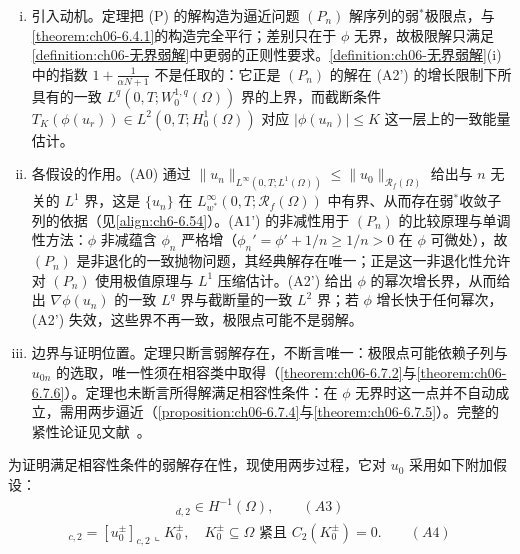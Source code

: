 \documentclass[../../main.tex]{subfiles}%
\begin{document}
\begin{remark}\label{remark:ch06-无界存在动机}
\begin{enumerate}[(i)]
\item 引入动机。定理把 (P) 的解构造为逼近问题 $(P_n)$ 解序列的弱$^*$极限点，与\cref{theorem:ch06-6.4.1}的构造完全平行；差别只在于 $\phi$ 无界，故极限解只满足\cref{definition:ch06-无界弱解}中更弱的正则性要求。\cref{definition:ch06-无界弱解}(i) 中的指数 $1+\frac{1}{\alpha N+1}$ 不是任取的：它正是 $(P_n)$ 的解在 (A2') 的增长限制下所具有的一致 $L^q(0,T;W^{1,q}_0(\Omega))$ 界的上界，而截断条件 $T_K(\phi(u_r))\in L^2(0,T;H^1_0(\Omega))$ 对应 $|\phi(u_n)|\leqslant K$ 这一层上的一致能量估计。

\item 各假设的作用。(A0) 通过 $\|u_n\|_{L^\infty(0,T;L^1(\Omega))}\leqslant\|u_0\|_{\mathscr{R}_f(\Omega)}$ 给出与 $n$ 无关的 $L^1$ 界，这是 $\{u_n\}$ 在 $L^\infty_{w^*}(0,T;\mathscr{R}_f(\Omega))$ 中有界、从而存在弱$^*$收敛子列的依据（见\eqref{align:ch6-6.54}）。(A1') 的非减性用于 $(P_n)$ 的比较原理与单调性方法：$\phi$ 非减蕴含 $\phi_n$ 严格增（$\phi_n'=\phi'+1/n\geqslant1/n>0$ 在 $\phi$ 可微处），故 $(P_n)$ 是非退化的一致抛物问题，其经典解存在唯一；正是这一非退化性允许对 $(P_n)$ 使用极值原理与 $L^1$ 压缩估计。(A2') 给出 $\phi$ 的幂次增长界，从而给出 $\nabla\phi(u_n)$ 的一致 $L^q$ 界与截断量的一致 $L^2$ 界；若 $\phi$ 增长快于任何幂次，(A2') 失效，这些界不再一致，极限点可能不是弱解。

\item 边界与证明位置。定理只断言弱解存在，不断言唯一：极限点可能依赖子列与 $u_{0n}$ 的选取，唯一性须在相容类中取得（\cref{theorem:ch06-6.7.2}与\cref{theorem:ch06-6.7.6}）。定理也未断言所得解满足相容性条件：在 $\phi$ 无界时这一点并不自动成立，需用两步逼近（\cref{proposition:ch06-6.7.4}与\cref{theorem:ch06-6.7.5}）。完整的紧性论证见文献~\cite{ref87}。
\end{enumerate}
\end{remark}

为证明满足相容性条件的弱解存在性，现使用两步过程，它对 $u_0$ 采用如下附加假设：
\begin{align*}
[u^\pm_0]_{d,2}\in H^{-1}(\Omega), \qquad(A3)
\end{align*}
\begin{align*}
[u^\pm_0]_{c,2}=[u^\pm_0]_{c,2}\llcorner K^\pm_0,\quad
K^\pm_0\subseteq\Omega\text{ 紧且 }C_2(K^\pm_0)=0. \qquad(A4)
\end{align*}
\end{document}

